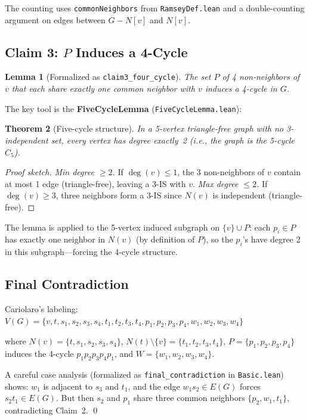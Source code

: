 \documentclass[11pt]{article}
\newtheorem{theorem}{Theorem}[section]
\newtheorem{lemma}[theorem]{Lemma}
\newcommand{\lean}[1]{\texttt{#1}}
\begin{document}
\noindent
The counting uses \lean{commonNeighbors} from \texttt{RamseyDef.lean}
and a double-counting argument on edges between $G - N[v]$ and $N[v]$.

\subsection{Claim 3: \texorpdfstring{$P$ Induces a 4-Cycle}{P Induces a 4-Cycle}}

\begin{lemma}[Formalized as \lean{claim3\_four\_cycle}]
The set $P$ of 4 non-neighbors of $v$ that each share exactly one common
neighbor with $v$ induces a 4-cycle in $G$.
\end{lemma}

The key tool is the \textbf{FiveCycleLemma} (\texttt{FiveCycleLemma.lean}):

\begin{theorem}[Five-cycle structure]
In a 5-vertex triangle-free graph with no 3-independent set, every vertex
has degree exactly~2 (i.e., the graph is the 5-cycle $C_5$).
\end{theorem}

\begin{proof}[Proof sketch]
\textit{Min degree $\geq 2$.} If $\deg(v) \leq 1$, the 3 non-neighbors of $v$
contain at most 1 edge (triangle-free), leaving a 3-IS with $v$.
\textit{Max degree $\leq 2$.} If $\deg(v) \geq 3$, three neighbors form
a 3-IS since $N(v)$ is independent (triangle-free).
\end{proof}

\noindent
The lemma is applied to the 5-vertex induced subgraph on $\{v\} \cup P$:
each $p_i \in P$ has exactly one neighbor in $N(v)$ (by definition of $P$),
so the $p_i$'s have degree 2 in this subgraph---forcing the 4-cycle structure.

\subsection{Final Contradiction}

Cariolaro's labeling:
$V(G) = \{v, t, s_1, s_2, s_3, s_4, t_1, t_2, t_3, t_4,
           p_1, p_2, p_3, p_4, w_1, w_2, w_3, w_4\}$

\noindent
where $N(v) = \{t, s_1, s_2, s_3, s_4\}$, $N(t) \setminus \{v\}
= \{t_1, t_2, t_3, t_4\}$, $P = \{p_1, p_2, p_3, p_4\}$ induces the
4-cycle $p_1 p_2 p_3 p_4 p_1$, and $W = \{w_1, w_2, w_3, w_4\}$.

A careful case analysis (formalized as \lean{final\_contradiction} in
\texttt{Basic.lean}) shows:
$w_1$ is adjacent to $s_3$ and $t_1$, and the edge $w_1 s_2 \in E(G)$
forces $s_2 t_1 \in E(G)$.
But then $s_2$ and $p_1$ share three common neighbors $\{p_2, w_1, t_1\}$,
contradicting Claim~2. \qed
\end{document}
